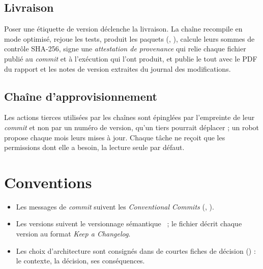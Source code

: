 \subsection{Livraison}

Poser une étiquette de version  déclenche la livraison. La chaîne recompile en
mode optimisé, rejoue les tests, produit les paquets (, ), calcule
leurs sommes de contrôle SHA-256, signe une \emph{attestation de provenance} qui relie
chaque fichier publié au \emph{commit} et à l'exécution qui l'ont produit, et publie le
tout avec le PDF du rapport et les notes de version extraites du journal des modifications.

\subsection{Chaîne d'approvisionnement}

Les actions tierces utilisées par les chaînes sont épinglées par l'empreinte de leur
\emph{commit} et non par un numéro de version, qu'un tiers pourrait déplacer ; un robot
propose chaque mois leurs mises à jour. Chaque tâche ne reçoit que les permissions dont elle
a besoin, la lecture seule par défaut.

\section{Conventions}

\begin{itemize}
    \item Les messages de \emph{commit} suivent les \emph{Conventional Commits}
          (, ).
    \item Les versions suivent le versionnage sémantique~\cite{semver} ; le fichier
           décrit chaque version au format \emph{Keep a Changelog}.
    \item Les choix d'architecture sont consignés dans de courtes fiches de décision
          () : le contexte, la décision, ses conséquences.
\end{itemize}
